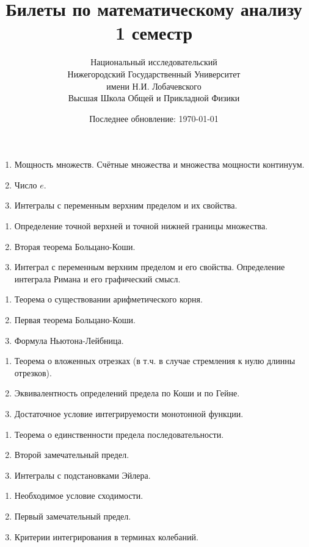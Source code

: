 \documentclass{article}
\title{Билеты по математическому анализу \\ 1 семестр}
\date{Последнее обновление: \today}
\author{Национальный исследовательский \\
Нижегородский Государственный Университет \\
имени Н.И. Лобачевского \vspace{0.5em} \\
Высшая Школа Общей и Прикладной Физики \vspace{0.5em}}
\newcounter{ticket}[subsection]
\newenvironment{ticket}[1][]{\item[Билет \ifthenelse{\equal{#1}{}}{}{\setcounter{ticket}{#1}}\theticket\refstepcounter{ticket}:]\phantom{}\begin{enumerate}}{\end{enumerate}}
\begin{document}
\maketitle
\begin{description}
	\begin{ticket}[1]
		\item Мощность множеств. Счётные множества и множества мощности континуум.
		\item Число $e$.
		\item Интегралы с переменным верхним пределом и их свойства.
	\end{ticket}
	\begin{ticket}
		\item Определение точной верхней и точной нижней границы множества.
		\item Вторая теорема Больцано-Коши.
		\item Интеграл с переменным верхним пределом и его свойства.
		Определение интеграла Римана и его графический смысл.
	\end{ticket}
	\begin{ticket}
		\item Теорема о существовании арифметического корня.
		\item Первая теорема Больцано-Коши.
		\item Формула Ньютона-Лейбница.
	\end{ticket}
	\begin{ticket}
		\item Теорема о вложенных отрезках (в т.ч. в случае стремления к нулю длинны отрезков).
		\item Эквивалентность определений предела по Коши и по Гейне.
		\item Достаточное условие интегрируемости монотонной функции.
	\end{ticket}
	\begin{ticket}[6]
		\item Теорема о единственности предела последовательности.
		\item Второй замечательный предел.
		\item Интегралы с подстановками Эйлера.
	\end{ticket}
	\begin{ticket}
		\item Необходимое условие сходимости.
		\item Первый замечательный предел.
		\item Критерии интегрирования в терминах колебаний.
	\end{ticket}

\end{description}
\end{document}
